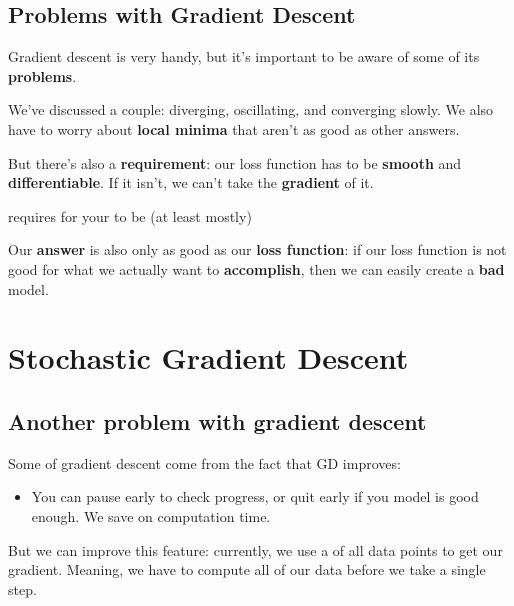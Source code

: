     
    \subsection{Problems with Gradient Descent}
        
        Gradient descent is very handy, but it's important to be aware of some of its \textbf{problems}.
        
        We've discussed a couple: diverging, oscillating, and converging slowly. We also have to worry about \textbf{local minima} that aren't as good as other answers.
        
        But there's also a \textbf{requirement}: our loss function has to be \textbf{smooth} and \textbf{differentiable}. If it isn't, we can't take the \textbf{gradient} of it.\\
        
        \begin{concept}
             requires for your  to be (at least mostly) 
        \end{concept}
        
        Our \textbf{answer} is also only as good as our \textbf{loss function}: if our loss function is not good for what we actually want to \textbf{accomplish}, then we can easily create a \textbf{bad} model.
        
\pagebreak
\section{Stochastic Gradient Descent}

    \subsection{Another problem with gradient descent}
    
        Some  of gradient descent come from the fact that GD  improves: 

        \begin{itemize}
            \item You can pause early to check progress, or quit early if you model is good enough. We save on computation time.
        \end{itemize}

        But we can improve this feature: currently, we use a  of all data points to get our gradient. Meaning, we have to compute all of our data before we take a single step. 


